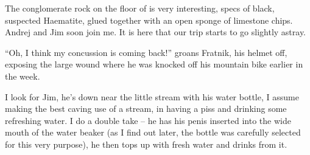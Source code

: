 The conglomerate rock on the floor of  is
very interesting, specs of black, suspected Haematite, glued together
with an open sponge of limestone chips. Andrej and Jim soon join me. It
is here that our trip starts to go slightly astray.

``Oh, I think my concussion is coming back!'' groans Fratnik, his helmet
off, exposing the large wound where he was knocked off his mountain bike
earlier in the week.

I look for Jim, he's down near the little stream with his water bottle,
I assume making the best caving use of a stream, in having a piss and
drinking some refreshing water. I do a double take -- he has his penis
inserted into the wide mouth of the water beaker (as I find out later,
the bottle was carefully selected for this very purpose), he then tops
up with fresh water and drinks from it.


